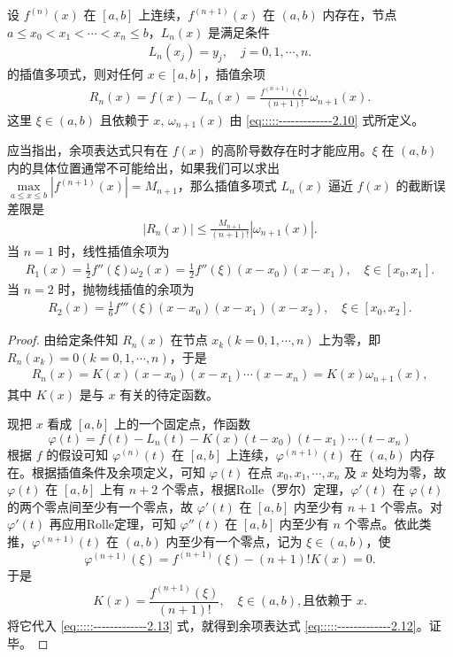 \documentclass[../../main.tex]{subfiles}
\begin{document}
\begin{theorem}
设 $f^{(n)}(x)$ 在 $[a, b]$ 上连续，$f^{(n + 1)}(x)$ 在 $(a, b)$ 内存在，节点 $a \leqslant x_0 < x_1 < \cdots < x_n \leqslant b$，$L_n(x)$ 是满足条件 
\begin{align*}
L_n(x_j) = y_j, \quad j = 0, 1, \cdots, n.
\end{align*}
的插值多项式，则对任何 $x \in [a, b]$，插值余项 
\begin{align}
R_n(x) = f(x) - L_n(x) = \frac{f^{(n + 1)}(\xi)}{(n + 1)!} \omega_{n + 1}(x). \label{eq:::::-------------2.12}
\end{align}
这里 $\xi \in (a, b)$ 且依赖于 $x$,$\,\,\omega_{n + 1}(x)$ 由 \eqref{eq:::::-------------2.10} 式所定义。
\end{theorem}
\begin{remark}
应当指出，余项表达式只有在 $f(x)$ 的高阶导数存在时才能应用。$\xi$ 在 $(a, b)$ 内的具体位置通常不可能给出，如果我们可以求出 $\max\limits_{a \leqslant x \leqslant b} | f^{(n + 1)}(x) | = M_{n + 1}$，那么插值多项式 $L_n(x)$ 逼近 $f(x)$ 的截断误差限是
\begin{align}
| R_n(x) | \leqslant \frac{M_{n + 1}}{(n + 1)!} | \omega_{n + 1}(x) | .\label{eq:数值分析-2.14}
\end{align}
当 $n = 1$ 时，线性插值余项为 
\begin{align}
R_1(x) = \frac{1}{2} f''(\xi) \omega_2(x) = \frac{1}{2} f''(\xi)(x - x_0)(x - x_1), \quad \xi \in [x_0, x_1] .\label{eq:数值分析-2.15}
\end{align}
当 $n = 2$ 时，抛物线插值的余项为 
\begin{align}
R_2(x) = \frac{1}{6} f'''(\xi)(x - x_0)(x - x_1)(x - x_2), \quad \xi \in [x_0, x_2].\label{eq:数值分析-2.16}
\end{align}
\end{remark}
\begin{proof}
由给定条件知 $R_n(x)$ 在节点 $x_k (k = 0, 1, \cdots, n)$ 上为零，即 $R_n(x_k) = 0 (k = 0, 1, \cdots, n)$，于是 
\begin{align}
R_n(x) = K(x)(x - x_0)(x - x_1) \cdots (x - x_n) = K(x) \omega_{n + 1}(x),\label{eq:::::-------------2.13}
\end{align}
其中 $K(x)$ 是与 $x$ 有关的待定函数。

现把 $x$ 看成 $[a, b]$ 上的一个固定点，作函数 
\[
\varphi(t) = f(t) - L_n(t) - K(x)(t - x_0)(t - x_1) \cdots (t - x_n)
\]
根据 $f$ 的假设可知 $\varphi^{(n)}(t)$ 在 $[a, b]$ 上连续，$\varphi^{(n + 1)}(t)$ 在 $(a, b)$ 内存在。根据插值条件及余项定义，可知 $\varphi(t)$ 在点 $x_0, x_1, \cdots, x_n$ 及 $x$ 处均为零，故 $\varphi(t)$ 在 $[a, b]$ 上有 $n + 2$ 个零点，根据Rolle（罗尔）定理，$\varphi'(t)$ 在 $\varphi(t)$ 的两个零点间至少有一个零点，故 $\varphi'(t)$ 在 $[a, b]$ 内至少有 $n + 1$ 个零点。对 $\varphi'(t)$ 再应用Rolle定理，可知 $\varphi''(t)$ 在 $[a, b]$ 内至少有 $n$ 个零点。依此类推，$\varphi^{(n + 1)}(t)$ 在 $(a, b)$ 内至少有一个零点，记为 $\xi \in (a, b)$，使 
\[
\varphi^{(n + 1)}(\xi) = f^{(n + 1)}(\xi) - (n + 1)! K(x) = 0.
\]
于是 
\[
K(x) = \frac{f^{(n + 1)}(\xi)}{(n + 1)!}, \quad \xi \in (a, b), \text{且依赖于 } x.
\]
将它代入 \eqref{eq:::::-------------2.13} 式，就得到余项表达式 \eqref{eq:::::-------------2.12}。证毕。
\end{proof}
\end{document}
